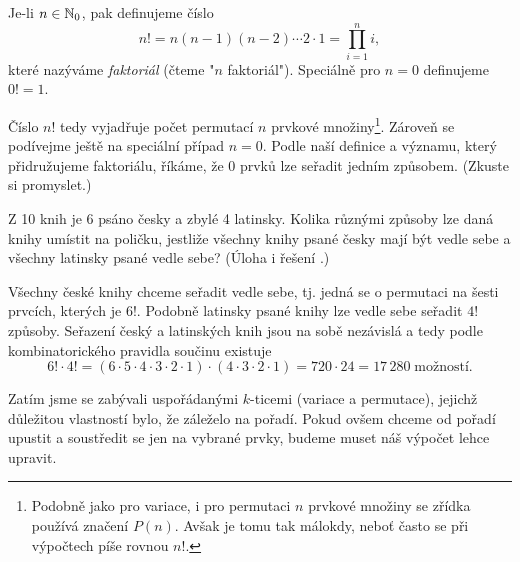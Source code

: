 \begin{definition}[Faktoriál]
    Je-li $n\in\mathbb{N}_0$, pak definujeme číslo
    \begin{equation*}
        n!=n(n-1)(n-2)\cdots 2\cdot 1=\prod_{i=1}^{n}i,
    \end{equation*}
    které nazýváme \emph{faktoriál} (čteme "$n$ faktoriál"). Speciálně pro $n=0$ definujeme $0!=1$.
\end{definition}

Číslo $n!$ tedy vyjadřuje počet permutací $n$ prvkové množiny\footnote{Podobně jako pro variace, i pro permutaci $n$ prvkové množiny se zřídka používá značení $P(n)$. Avšak je tomu tak málokdy, neboť často se při výpočtech píše rovnou $n!$.}. Zároveň se podívejme ještě na speciální případ $n=0$. Podle naší definice a významu, který přidružujeme faktoriálu, říkáme, že 0 prvků lze seřadit jedním způsobem. (Zkuste si promyslet.)

\begin{task}
    Z 10 knih je 6 psáno česky a zbylé 4 latinsky. Kolika různými způsoby lze daná knihy umístit na poličku, jestliže všechny knihy psané česky mají být vedle sebe a všechny latinsky psané vedle sebe? (Úloha i řešení \cite{Havrlant2022}.)
\end{task}
\begin{solution}
    Všechny české knihy chceme seřadit vedle sebe, tj. jedná se o permutaci na šesti prvcích, kterých je $6!$. Podobně latinsky psané knihy lze vedle sebe seřadit $4!$ způsoby. Seřazení český a latinských knih jsou na sobě nezávislá a tedy podle kombinatorického pravidla součinu existuje
    \begin{equation*}
        6!\cdot 4!=(6\cdot 5\cdot 4\cdot 3\cdot 2\cdot 1)\cdot(4\cdot 3\cdot 2\cdot 1)=720\cdot 24=17\,280\;\text{možností.}
    \end{equation*}
\end{solution}

Zatím jsme se zabývali uspořádanými $k$-ticemi (variace a permutace), jejichž důležitou vlastností bylo, že záleželo na pořadí. Pokud ovšem chceme od pořadí upustit a soustředit se jen na vybrané prvky, budeme muset náš výpočet lehce upravit.

